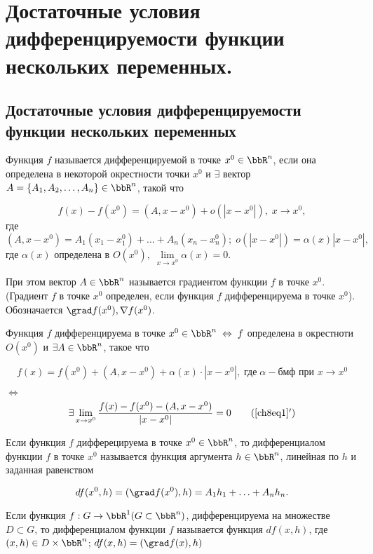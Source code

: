 \chapter[\texorpdfstring{Достаточные условия дифференцируемости функции не\-скольких переменных.}{Достаточные условия дифференцируемости функции нескольких переменных}]{Достаточные условия дифференцируемости функции нескольких переменных.}
\section[\texorpdfstring{Достаточные условия дифференцируемости функции \\несколь\-ких переменных.}{Достаточные условия дифференцируемости функции нескольких переменных}]{Достаточные условия дифференцируемости функции нескольких переменных}

\begin{defn}
Функция $f$ называется дифференцируемой в точке $x^0 \in \bbR^n$, если она определена в некоторой окрестности точки $x^0$ и $\exists$ вектор $A = \{ A_1, A_2, \ldots , A_n\} \in \bbR^n$, такой что 

\begin{equation} \label{ch8eq1}
f(x) - f(x^0) = (A, x - x^0) + o(|x - x^0|), \; x \to x^0, 
\end{equation}
где $(A, x - x^0) = A_1(x_1 - x^0_1) + \ldots + A_n(x_n - x^0_n); \; o(|x - x^0|) = \alpha(x)|x - x^0|,$ где $\alpha(x)$ определена в $O(x^0), \; \lim\limits_{x \to x^0} \alpha(x) = 0$.

При этом вектор $A \in \bbR^n$ называется градиентом функции $f$ в точке $x^0$. (Градиент $f$ в точке $x^0$ определен, если функция $f$ дифференцируема в точке $x^0$). Обозначается $\grad f(x^0), \nabla f(x^0)$.

Функция $f$ дифференцируема в точке $x^0 \in \bbR^n \; \Leftrightarrow \; f$ определена в окрестноти $O(x^0)$ и $\exists A \in \bbR^n$, такое что 

$$
f(x) = f(x^0) + (A, x - x^0) + \alpha(x) \cdot |x - x^0|, \; \textit{где} \; \alpha - \textit{бмф при } x \to x^0 
$$ 

$\Leftrightarrow \;$
\begin{equation} \label{ch8eq1'}
\exists \lim\limits_{x \to x^0} \frac{f(x) - f(x^0) - (A, x - x^0)}{|x - x^0|} = 0
\tag{\ref{ch8eq1}$'$}
\end{equation}

\end{defn}

\begin{defn}
Если функция $f$ дифферецируема в точке $x^0 \in \bbR^n$, то дифференциалом функции $f$ в точке $x^0$ называется функция аргумента $h \in \bbR^n$, линейная  по $h$ и заданная равенством

$$
df(x^0, h) = (\grad f(x^0), h) = A_1 h_1 + \ldots + A_n h_n.
$$

Если функция $f: G \to \bbR^1 (G \subset \bbR^n)$, дифференцируема на множестве $D \subset G$, то дифференциалом функции $f$ называется функция $df(x,h)$, где $(x,h) \in D \times \bbR^n$; $df(x,h) = (\grad f(x), h)$
\end{defn}


